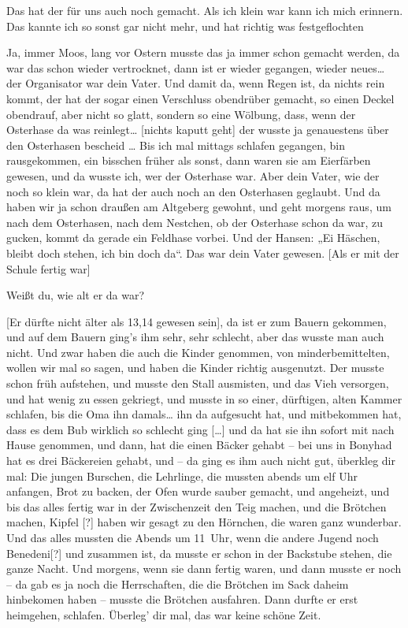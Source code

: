 \documentclass[ngerman,]{article}
\providecommand{\tightlist}{%
  \setlength{\itemsep}{0pt}\setlength{\parskip}{0pt}}
\begin{document}
\begin{multicols}{2}
\begin{description}
\tightlist
\item[Ruth]
Das hat der für uns auch noch gemacht. Als ich klein war kann ich mich
erinnern. Das kannte ich so sonst gar nicht mehr, und hat richtig was
festgeflochten
\item[Käthe]
Ja, immer Moos, lang vor Ostern musste das ja immer schon gemacht
werden, da war das schon wieder vertrocknet, dann ist er wieder
gegangen, wieder neues\ldots{} der Organisator war dein Vater. Und damit
da, wenn Regen ist, da nichts rein kommt, der hat der sogar einen
Verschluss obendrüber gemacht, so einen Deckel obendrauf, aber nicht so
glatt, sondern so eine Wölbung, dass, wenn der Osterhase da was
reinlegt\ldots{} {[}nichts kaputt geht{]} der wusste ja genauestens über
den Osterhasen bescheid \ldots{} Bis ich mal mittags schlafen gegangen,
bin rausgekommen, ein bisschen früher als sonst, dann waren sie am
Eierfärben gewesen, und da wusste ich, wer der Osterhase war. Aber dein
Vater, wie der noch so klein war, da hat der auch noch an den Osterhasen
geglaubt. Und da haben wir ja schon draußen am Altgeberg gewohnt, und
geht morgens raus, um nach dem Osterhasen, nach dem Nestchen, ob der
Osterhase schon da war, zu gucken, kommt da gerade ein Feldhase vorbei.
Und der Hansen: „Ei Häschen, bleibt doch stehen, ich bin doch da“. Das
war dein Vater gewesen. {[}Als er mit der Schule fertig war{]}
\item[Ruth]
Weißt du, wie alt er da war?
\item[Käthe]
{[}Er dürfte nicht älter als 13,14 gewesen sein{]}, da ist er zum Bauern
gekommen, und auf dem Bauern ging's ihm sehr, sehr schlecht, aber das
wusste man auch nicht. Und zwar haben die auch die Kinder genommen, von
minderbemittelten, wollen wir mal so sagen, und haben die Kinder richtig
ausgenutzt. Der musste schon früh aufstehen, und musste den Stall
ausmisten, und das Vieh versorgen, und hat wenig zu essen gekriegt, und
musste in so einer, dürftigen, alten Kammer schlafen, bis die Oma ihn
damals\ldots{} ihn da aufgesucht hat, und mitbekommen hat, dass es dem
Bub wirklich so schlecht ging {[}\ldots{}{]} und da hat sie ihn sofort
mit nach Hause genommen, und dann, hat die einen Bäcker gehabt – bei uns
in Bonyhad hat es drei Bäckereien gehabt, und – da ging es ihm auch
nicht gut, überkleg dir mal: Die jungen Burschen, die Lehrlinge, die
mussten abends um elf Uhr anfangen, Brot zu backen, der Ofen wurde
sauber gemacht, und angeheizt, und bis das alles fertig war in der
Zwischenzeit den Teig machen, und die Brötchen machen, Kipfel {[}?{]}
haben wir gesagt zu den Hörnchen, die waren ganz wunderbar. Und das
alles mussten die Abends um 11~Uhr, wenn die andere Jugend noch
Benedeni{[}?{]} und zusammen ist, da musste er schon in der Backstube
stehen, die ganze Nacht. Und morgens, wenn sie dann fertig waren, und
dann musste er noch – da gab es ja noch die Herrschaften, die die
Brötchen im Sack daheim hinbekomen haben – musste die Brötchen
ausfahren. Dann durfte er erst heimgehen, schlafen. Überleg' dir mal,
das war keine schöne Zeit.
\end{description}


\end{multicols}
\end{document}
